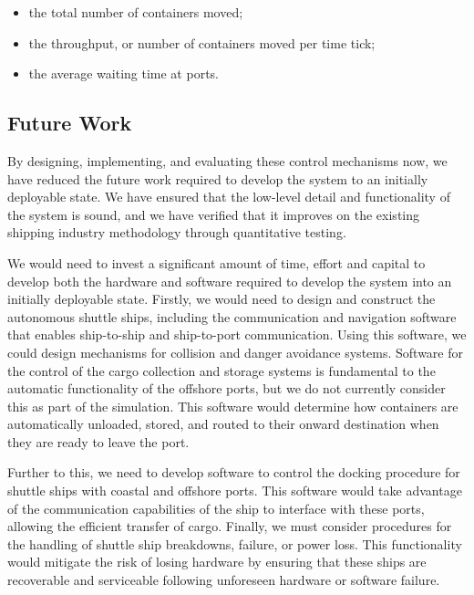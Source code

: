 \begin{itemize}[noitemsep]
	\item the total number of containers moved;
	\item the throughput, or number of containers moved per time tick;
	\item the average waiting time at ports.
\end{itemize}

\subsection{Future Work}

By designing, implementing, and evaluating these control mechanisms now, we have reduced the future work required to develop the system to an initially deployable state. We have ensured that the low-level detail and functionality of the system is sound, and we have verified that it improves on the existing shipping industry methodology through quantitative testing.

We would need to invest a significant amount of time, effort and capital to develop both the hardware and software required to develop the system into an initially deployable state. Firstly, we would need to design and construct the autonomous shuttle ships, including the communication and navigation software that enables ship-to-ship and ship-to-port communication. Using this software, we could design mechanisms for collision and danger avoidance systems. Software for the control of the cargo collection and storage systems is fundamental to the automatic functionality of the offshore ports, but we do not currently consider this as part of the simulation. This software would determine how containers are automatically unloaded, stored, and routed to their onward destination when they are ready to leave the port.

Further to this, we need to develop software to control the docking procedure for shuttle ships with coastal and offshore ports. This software would take advantage of the communication capabilities of the ship to interface with these ports, allowing the efficient transfer of cargo. Finally, we must consider procedures for the handling of shuttle ship breakdowns, failure, or power loss. This functionality would mitigate the risk of losing hardware by ensuring that these ships are recoverable and serviceable following unforeseen hardware or software failure.
